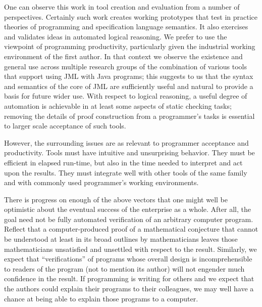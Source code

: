 \documentclass{llncs}
\begin{document}
One can observe this work in tool creation and evaluation from a
number of perspectives.  Certainly such work creates working
prototypes that test in practice theories of programming and
specification language semantics.  It also exercises and validates
ideas in automated logical reasoning.  We prefer to use the viewpoint
of programming productivity, particularly given the industrial working
environment of the first author.  In that context we observe the
existence and general use across multiple research groups of the
combination of various tools that support using JML with Java
programs; this suggests to us that the syntax and semantics of the
core of JML are sufficiently useful and natural to provide a basis for
future wider use.  With respect to logical reasoning, a useful degree
of automation is achievable in at least some aspects of static
checking tasks; removing the details of proof construction from a
programmer's tasks is essential to larger scale acceptance of such
tools.

However, the surrounding issues are as relevant to programmer
acceptance and productivity.  Tools must have intuitive and
unsurprising behavior. They must be efficient in elapsed run-time, but
also in the time needed to interpret and act upon the results.  They
must integrate well with other tools of the same family and with
commonly used programmer's working environments.


There is progress on enough of the above vectors that one might well
be optimistic about the eventual success of the enterprise as a whole.
After all, the goal need not be fully automated verification of an
arbitrary computer program.  Reflect that a computer-produced proof of
a mathematical conjecture that cannot be understood at least in its
broad outlines by mathematicians leaves those mathematicians
unsatisfied and unsettled with respect to the result.  Similarly, we
expect that ``verifications'' of programs whose overall design is
incomprehensible to readers of the program (not to mention its author)
will not engender much confidence in the result.  If programming is
writing for others and we expect that the authors could explain their
programs to their colleagues, we may well have a chance at being able
to explain those programs to a computer.

\end{document}

